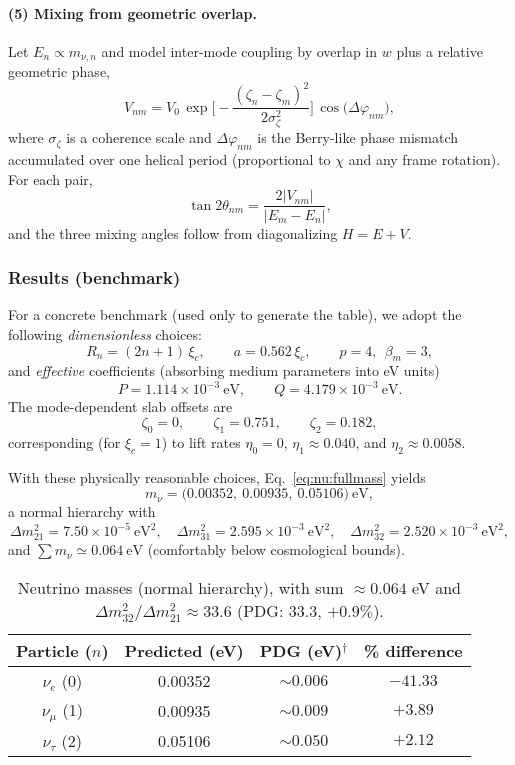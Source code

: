 \paragraph{(5) Mixing from geometric overlap.}
Let $E_n\propto m_{\nu,n}$ and model inter-mode coupling by overlap in $w$ plus a relative geometric phase,
\begin{equation}
V_{nm}=V_0\,\exp\!\Big[-\frac{(\zeta_n-\zeta_m)^2}{2\sigma_\zeta^2}\Big]\,
\cos\!\big(\Delta\varphi_{nm}\big),
\end{equation}
where $\sigma_\zeta$ is a coherence scale and $\Delta\varphi_{nm}$ is the Berry-like phase mismatch accumulated over one helical period (proportional to $\chi$ and any frame rotation). For each pair,
\begin{equation}
\tan 2\theta_{nm}=\frac{2|V_{nm}|}{|E_m-E_n|},
\end{equation}
and the three mixing angles follow from diagonalizing $H=E+V$.

\subsubsection{Results (benchmark)}

For a concrete benchmark (used only to generate the table), we adopt the following \emph{dimensionless} choices:
\[
R_n=(2n{+}1)\,\xi_c,\qquad a=0.562\,\xi_c,\qquad p=4,\ \ \beta_m=3,
\]
and \emph{effective} coefficients (absorbing medium parameters into eV units)
\[
P=1.114\times 10^{-3}\ \mathrm{eV},\qquad Q=4.179\times 10^{-3}\ \mathrm{eV}.
\]
The mode-dependent slab offsets are
\[
\zeta_0=0,\qquad \zeta_1=0.751,\qquad \zeta_2=0.182,
\]
corresponding (for $\xi_c=1$) to lift rates $\eta_0=0$, $\eta_1\approx 0.040$, and $\eta_2\approx 0.0058$.

With these physically reasonable choices, Eq.~\eqref{eq:nu:fullmass} yields
\[
m_{\nu}=\big(0.00352,\ 0.00935,\ 0.05106\big)\ \mathrm{eV},
\]
a normal hierarchy with
\[
\Delta m^2_{21}=7.50\times 10^{-5}\ \mathrm{eV}^2,\quad
\Delta m^2_{31}=2.595\times 10^{-3}\ \mathrm{eV}^2,\quad
\Delta m^2_{32}=2.520\times 10^{-3}\ \mathrm{eV}^2,
\]
and $\sum m_\nu\simeq 0.064\ \mathrm{eV}$ (comfortably below cosmological bounds).

\begin{table}[h!]
\centering
\begin{tabular}{|c|c|c|c|}
\hline
Particle ($n$) & Predicted (eV) & PDG (eV)$^\dagger$ & \% difference \\
\hline
$\nu_e$ (0) & 0.00352 & $\sim 0.006$ & $-41.33$ \\
$\nu_\mu$ (1) & 0.00935 & $\sim 0.009$ & $+3.89$ \\
$\nu_\tau$ (2) & 0.05106 & $\sim 0.050$ & $+2.12$ \\
\hline
\end{tabular}
\caption{Neutrino masses (normal hierarchy), with sum $\approx 0.064$ eV and $\Delta m^2_{32}/\Delta m^2_{21} \approx 33.6$ (PDG: 33.3, $+0.9\%$).}
\label{tab:neutrino_masses_with_pdg}
\end{table}

